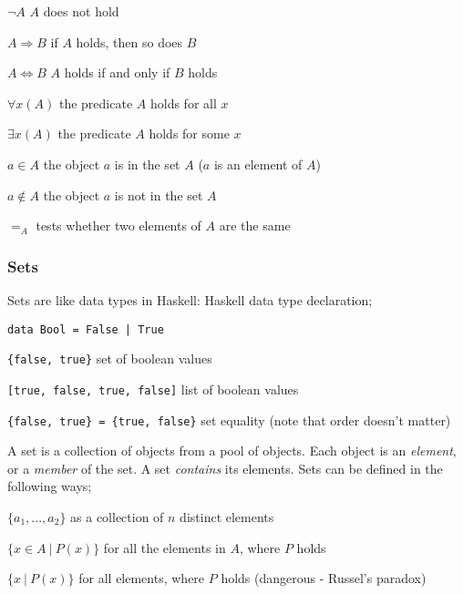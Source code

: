 \documentclass[a4paper, 12pt]{article}
\begin{document}
                $\neg A$ \hfill $A$ does not hold
                \smallskip

                $A \Rightarrow B$ \hfill if $A$ holds, then so does $B$
                \smallskip

                $A \Leftrightarrow B$ \hfill $A$ holds if and only if $B$ holds
                \smallskip

                $\forall x (A)$ \hfill the predicate $A$ holds for all $x$
                \smallskip

                $\exists x (A)$ \hfill the predicate $A$ holds for some $x$
                \smallskip

                $a \in A$ \hfill the object $a$ is in the set $A$ ($a$ is an element of $A$)
                \smallskip

                $a \notin A$ \hfill the object $a$ is not in the set $A$
                \smallskip

                $=_A$ \hfill tests whether two elements of $A$ are the same
            \subsubsection*{Sets}
                Sets are like data types in Haskell: Haskell data type declaration;
                \medskip

                \texttt{data Bool = False | True}
                \smallskip

                \texttt{\{false, true\}} \hfill set of boolean values
                \smallskip

                \texttt{[true, false, true, false]} \hfill list of boolean values
                \smallskip

                \texttt{\{false, true\} = \{true, false\}} \hfill set equality (note that order doesn't matter)
                \medskip

                A set is a collection of objects from a pool of objects. Each object is an \textit{element}, or a \textit{member} of the set. A set \textit{contains} its elements. Sets can be defined in the following ways;
                \medskip

                $\{a_1, ..., a_2\}$ \hfill as a collection of $n$ distinct elements
                \smallskip

                $\{x \in A\ |\ P(x)\}$ \hfill for all the elements in $A$, where $P$ holds
                \smallskip

                $\{x\ |\ P(x)\}$ \hfill for all elements, where $P$ holds (dangerous - Russel's paradox)
\end{document}
